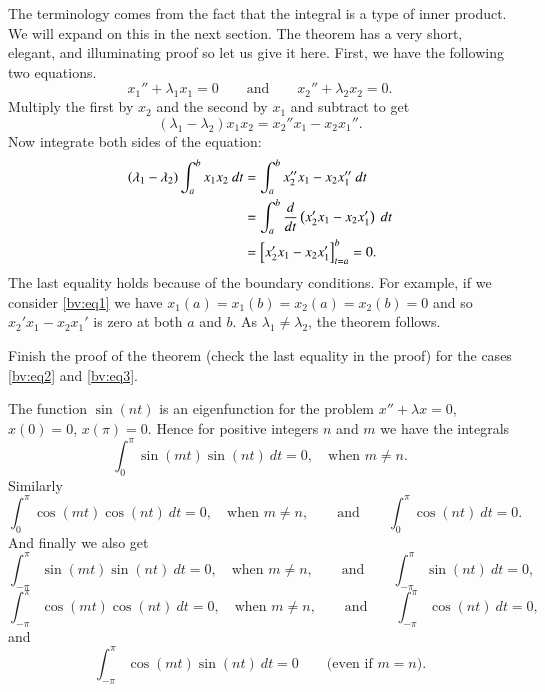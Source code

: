 The terminology comes from the fact that the integral is a type of
inner product.  We will expand on this in the next section.  The theorem
has a very short, elegant, and illuminating proof so let us give it here.
First, we have the following two equations.
\begin{equation*}
x_1'' + \lambda_1 x_1 = 0
\qquad \text{and} \qquad
x_2'' + \lambda_2 x_2 = 0.
\end{equation*}
Multiply the first by $x_2$ and the second by $x_1$ and subtract to get
\begin{equation*}
(\lambda_1 - \lambda_2) x_1 x_2 = x_2'' x_1 - x_2 x_1'' .
\end{equation*}
Now integrate both sides of the equation:
\begin{equation*}
\begin{split}
(\lambda_1 - \lambda_2) \int_a^b x_1 x_2 ~dt
& =
\int_a^b x_2'' x_1 - x_2 x_1'' ~dt \\
& =
\int_a^b \frac{d}{dt} \left( x_2' x_1 - x_2 x_1' \right) ~dt \\
& =
\Bigl[ x_2' x_1 - x_2 x_1' \Bigr]_{t=a}^b
= 0 .
\end{split}
\end{equation*}
The last equality holds because of the boundary conditions.  For example, if
we consider \eqref{bv:eq1} we have $x_1(a) = x_1(b) = x_2(a) = x_2(b) = 0$
and so $x_2' x_1 - x_2 x_1'$ is zero at both $a$ and $b$.
As $\lambda_1 \not= \lambda_2$, the theorem follows.

\begin{exercise}[easy]
Finish the proof of the theorem (check the last equality in the proof) for the cases
\eqref{bv:eq2} and \eqref{bv:eq3}.
\end{exercise}

The function $\sin (n t)$ is an eigenfunction for the problem
$x''+\lambda x = 0$, $x(0) = 0$, $x(\pi) = 0$. 
Hence for positive
integers $n$ and $m$ we have the integrals
\begin{equation*}
\int_{0}^\pi \sin (mt) \sin (nt) ~dt = 0 ,
\quad
\text{when } m \not = n.
\end{equation*}
Similarly
\begin{equation*}
\int_{0}^\pi \cos (mt) \cos (nt) ~dt = 0 ,
\quad
\text{when } m \not = n,
\qquad \text{and} \qquad
\int_{0}^\pi  \cos (nt) ~dt = 0 .
\end{equation*}
And finally we also get
\begin{equation*}
\int_{-\pi}^\pi \sin (mt) \sin (nt) ~dt = 0 ,
\quad
\text{when } m \not = n, 
\qquad \text{and} \qquad
\int_{-\pi}^\pi  \sin (nt) ~dt = 0 ,
\end{equation*}
\begin{equation*}
\int_{-\pi}^\pi \cos (mt) \cos (nt) ~dt = 0 ,
\quad
\text{when } m \not = n,
\qquad \text{and} \qquad
\int_{-\pi}^\pi  \cos (nt) ~dt = 0 ,
\end{equation*}
and
\begin{equation*}
\int_{-\pi}^\pi \cos (mt) \sin (nt) ~dt = 0 
\qquad \text{(even if $m=n$).}
\end{equation*}

